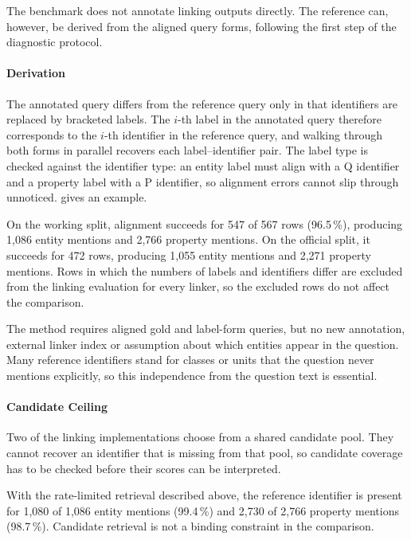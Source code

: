 The benchmark does not annotate linking outputs directly.
The reference can, however, be derived from the aligned query forms, following the first step of the diagnostic protocol.

\paragraph{Derivation}

The annotated query differs from the reference query only in that identifiers are replaced by bracketed labels.
The $i$-th label in the annotated query therefore corresponds to the $i$-th identifier in the reference query, and walking through both forms in parallel recovers each label--identifier pair.
The label type is checked against the identifier type: an entity label must align with a Q identifier and a property label with a P identifier, so alignment errors cannot slip through unnoticed.
 gives an example.

On the working split, alignment succeeds for 547 of 567 rows (96.5\,\%), producing 1,086 entity mentions and 2,766 property mentions.
On the official split, it succeeds for 472 rows, producing 1,055 entity mentions and 2,271 property mentions.
Rows in which the numbers of labels and identifiers differ are excluded from the linking evaluation for every linker, so the excluded rows do not affect the comparison.

The method requires aligned gold and label-form queries, but no new annotation, external linker index or assumption about which entities appear in the question.
Many reference identifiers stand for classes or units that the question never mentions explicitly, so this independence from the question text is essential.

\paragraph{Candidate Ceiling}

Two of the linking implementations choose from a shared candidate pool.
They cannot recover an identifier that is missing from that pool, so candidate coverage has to be checked before their scores can be interpreted.

With the rate-limited retrieval described above, the reference identifier is present for 1,080 of 1,086 entity mentions (99.4\,\%) and 2,730 of 2,766 property mentions (98.7\,\%).
Candidate retrieval is not a binding constraint in the comparison.

